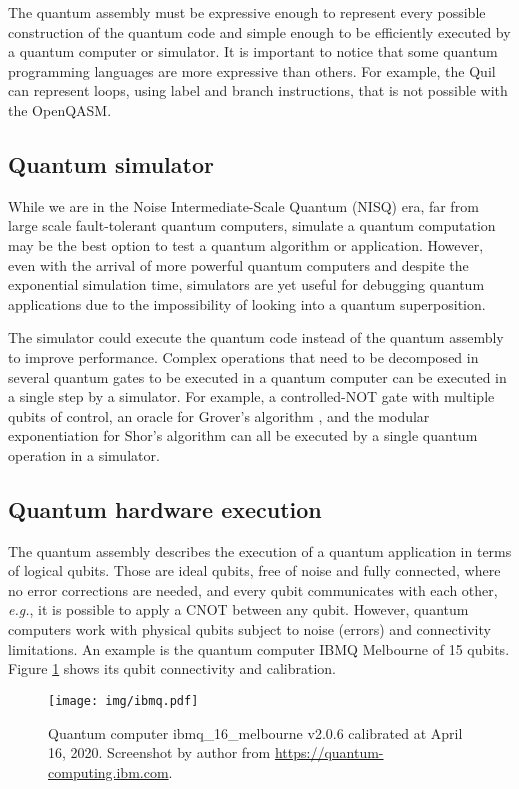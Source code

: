 \documentclass[preprint,3p,times,twocolumn]{elsarticle}
\begin{document}
The quantum assembly must be expressive enough to represent every possible
construction of the quantum code and simple enough to be efficiently executed
by a quantum computer or simulator. It is important to notice that some quantum
programming languages are more expressive than others. For example, the Quil
can represent loops, using label and branch instructions, that is not possible
with the OpenQASM.


\subsection{Quantum simulator}

While we are in the Noise Intermediate-Scale Quantum (NISQ) era, far from large
scale fault-tolerant quantum computers, simulate a quantum computation may be the
best option to test a quantum algorithm or application. However, even with the
arrival of more powerful quantum computers and despite the exponential
simulation time, simulators are yet useful for debugging quantum applications
due to the impossibility of looking into a quantum superposition.

The simulator could execute the quantum code instead of the quantum assembly to
improve performance. Complex operations that need to be decomposed in several
quantum gates to be executed in a quantum computer can be executed in a single
step by a simulator. For example, a controlled-NOT gate with multiple qubits of
control, an oracle for Grover's algorithm \cite{Grover1997}, and the modular
exponentiation for Shor's algorithm \cite{Shor1997} can all be executed by a
single quantum operation in a simulator.

\subsection{Quantum hardware execution}

The quantum assembly describes the execution of a quantum application in terms
of logical qubits. Those are ideal qubits, free of noise and fully connected,
where no error corrections are needed, and every qubit communicates with each
other, \textit{e.g.}, it is possible to apply a CNOT between any qubit.
However, quantum computers work with physical qubits subject to noise (errors)
and connectivity limitations. An example is the quantum computer IBMQ Melbourne
of 15 qubits. Figure \ref{fig:ibmq} shows its qubit connectivity and
calibration.

\begin{figure}[h]
    \centering
    \texttt{[image: img/ibmq.pdf]}
    \caption{Quantum computer ibmq\_16\_melbourne v2.0.6 calibrated at April
    16, 2020. Screenshot by author from \url{https://quantum-computing.ibm.com}.
    } %
    \label{fig:ibmq}
\end{figure}
\end{document}
